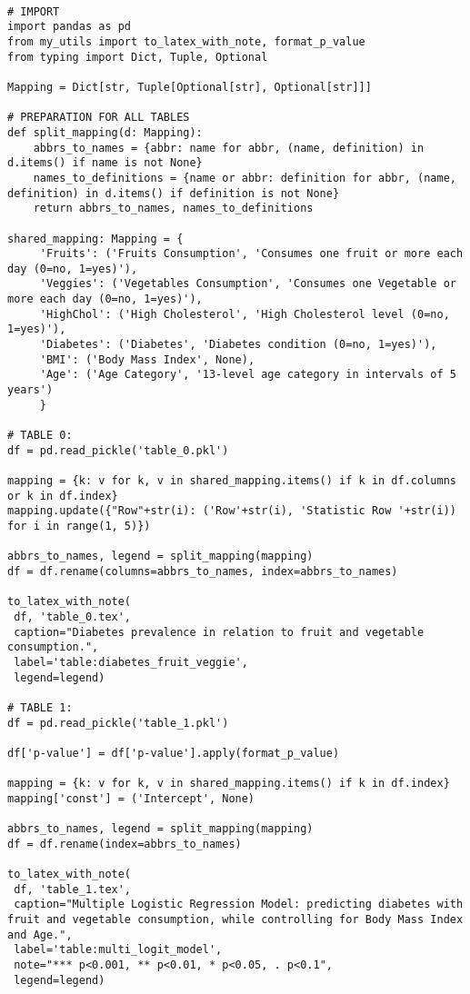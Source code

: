 \documentclass[11pt]{article}
\begin{document}
\begin{verbatim}

# IMPORT
import pandas as pd
from my_utils import to_latex_with_note, format_p_value
from typing import Dict, Tuple, Optional

Mapping = Dict[str, Tuple[Optional[str], Optional[str]]]

# PREPARATION FOR ALL TABLES
def split_mapping(d: Mapping):
    abbrs_to_names = {abbr: name for abbr, (name, definition) in d.items() if name is not None}
    names_to_definitions = {name or abbr: definition for abbr, (name, definition) in d.items() if definition is not None}
    return abbrs_to_names, names_to_definitions

shared_mapping: Mapping = {
     'Fruits': ('Fruits Consumption', 'Consumes one fruit or more each day (0=no, 1=yes)'),
     'Veggies': ('Vegetables Consumption', 'Consumes one Vegetable or more each day (0=no, 1=yes)'),
     'HighChol': ('High Cholesterol', 'High Cholesterol level (0=no, 1=yes)'),
     'Diabetes': ('Diabetes', 'Diabetes condition (0=no, 1=yes)'),
     'BMI': ('Body Mass Index', None),
     'Age': ('Age Category', '13-level age category in intervals of 5 years')
     }

# TABLE 0:
df = pd.read_pickle('table_0.pkl')

mapping = {k: v for k, v in shared_mapping.items() if k in df.columns or k in df.index}
mapping.update({"Row"+str(i): ('Row'+str(i), 'Statistic Row '+str(i)) for i in range(1, 5)})

abbrs_to_names, legend = split_mapping(mapping)
df = df.rename(columns=abbrs_to_names, index=abbrs_to_names)

to_latex_with_note(
 df, 'table_0.tex',
 caption="Diabetes prevalence in relation to fruit and vegetable consumption.", 
 label='table:diabetes_fruit_veggie',
 legend=legend)

# TABLE 1:
df = pd.read_pickle('table_1.pkl')

df['p-value'] = df['p-value'].apply(format_p_value)

mapping = {k: v for k, v in shared_mapping.items() if k in df.index}
mapping['const'] = ('Intercept', None)

abbrs_to_names, legend = split_mapping(mapping)
df = df.rename(index=abbrs_to_names)

to_latex_with_note(
 df, 'table_1.tex',
 caption="Multiple Logistic Regression Model: predicting diabetes with fruit and vegetable consumption, while controlling for Body Mass Index and Age.",
 label='table:multi_logit_model',
 note="*** p<0.001, ** p<0.01, * p<0.05, . p<0.1",
 legend=legend)

\end{verbatim}
\end{document}
